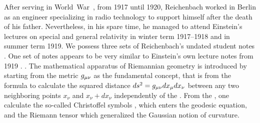 \documentclass[draft]{article}
\newcommand{\xdx}{\ensuremath{x_\nu} and \ensuremath{x_\nu + dx_\nu}\xspace}
\begin{document}

After serving in World~War~, from 1917 until 1920, Reichenbach worked in Berlin as an engineer specializing in radio technology to support himself after the death of his father. Nevertheless, in his spare time, he managed to attend Einstein's lectures on special and general relativity in winter term 1917--1918 and in summer term 1919. We possess three sets of Reichenbach's undated student notes \citep[028-01-04, 028-01-03, 028-01-01]{HR}. One set of notes \citep[028-01-01]{HR} appears to be very similar to Einstein's own lecture notes from 1919 \citep{Einstein1919c}. . The mathematical apparatus of Riemannian geometry is introduced by starting from the metric $g_{\mu\nu}$ as the fundamental concept, that is from the formula to calculate the squared distance $ds^2=g_{\mu\nu} dx_\mu dx_\nu$ between any two neighboring points \xdx independently of the \cs. From the \gmn, one calculate the so-called Christoffel symbols \christoffel{\mu}{\nu}{\tau}, which enters the geodesic equation, and the Riemann tensor \rite which generalized the Gaussian notion of curvature. 
\end{document}
